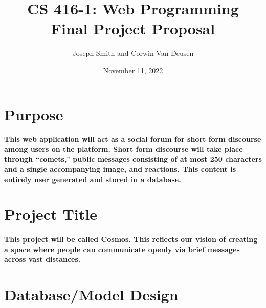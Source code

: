 \documentclass{article}
\title{CS 416-1: Web Programming \\ \large{Final Project Proposal}}
\author{Joseph Smith and Corwin Van Deusen}
\date{November 11, 2022}
\begin{document}
    \maketitle
    
    \tableofcontents
    
    \section{Purpose}
    \paragraph{This web application will act as a social forum for short form discourse among users on the platform. Short form discourse will take place through ``comets," public messages consisting of at most 250 characters and a single accompanying image, and reactions. This content is entirely user generated and stored in a database.}
    
    \section{Project Title}
    \paragraph{This project will be called Cosmos. This reflects our vision of creating a space where people can communicate openly via brief messages across vast distances.}
    
    \newpage
    
    \section{Database/Model Design}
\end{document}
